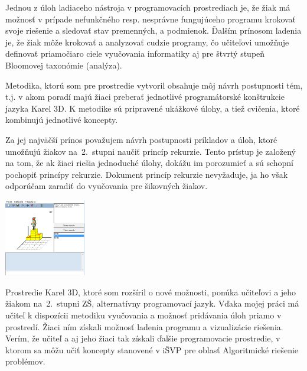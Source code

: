 \documentclass{svk_short_sk}
\newenvironment{nscenter}
 {\parskip=0pt\par\nopagebreak\centering}
 {\par\noindent\ignorespacesafterend}
\begin{document}
Jednou z úloh ladiaceho nástroja v programovacích prostrediach je, že žiak má možnosť v prípade nefunkčného resp. nesprávne fungujúceho programu krokovať svoje riešenie a sledovať stav premenných, a podmienok.
Ďalším prínosom ladenia je, že žiak môže krokovať a analyzovať cudzie programy, čo učiteľovi umožňuje definovať priamočiaro ciele vyučovania informatiky aj pre štvrtý stupeň Bloomovej taxonómie (analýza).

Metodika, ktorú som pre prostredie vytvoril obsahuje môj návrh postupnosti tém, t.j. v akom poradí majú žiaci preberať jednotlivé programátorské konštrukcie jazyka Karel 3D.
K metodike sú pripravené ukážkové úlohy, a tiež cvičenia, ktoré kombinujú jednotlivé koncepty.

Za jej najväčší prínos považujem návrh postupnosti príkladov a úloh, ktoré umožňujú žiakov na~2.~stupni naučiť princíp rekurzie.
Tento prístup je založený na tom, že ak žiaci riešia jednoduché úlohy, dokážu im porozumieť a sú schopní pochopiť princípy rekurzie.
Dokument \cite{SPU} princíp rekurzie nevyžaduje, ja ho však odporúčam zaradiť do vyučovania pre šikovných žiakov.
 
\begin{nscenter} 
\includegraphics[width=0.266\textwidth]{images/karelNaStupni}
\end{nscenter} 

Prostredie Karel 3D, ktoré som rozšíril o nové možnosti, ponúka učiteľovi a jeho žiakom na~2.~stupni ZŠ, alternatívny programovací jazyk.
Vďaka mojej práci má učiteľ k dispozícii metodiku vyučovania a možnosť pridávania úloh priamo v prostredí.
Žiaci ním získali možnosť ladenia programu a vizualizácie riešenia.
Verím, že učiteľ a aj jeho žiaci tak získali ďalšie programovacie prostredie, v ktorom sa môžu učiť koncepty stanovené v iŠVP pre oblasť Algoritmické riešenie problémov.





\end{document}
